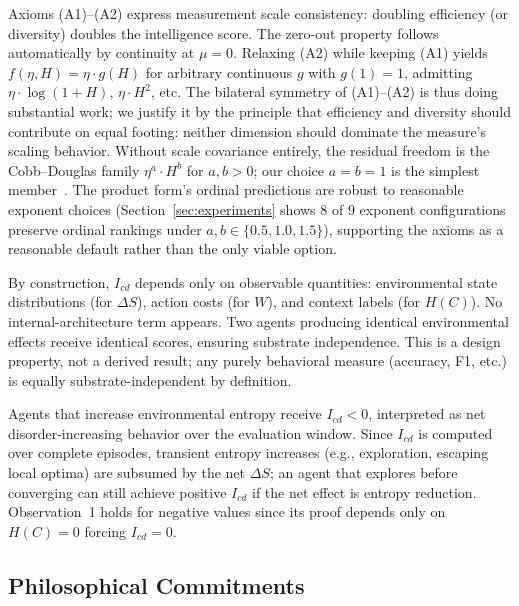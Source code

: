 \documentclass[runningheads,a4paper]{llncs}
\begin{document}
Axioms (A1)--(A2) express measurement scale consistency: doubling efficiency (or diversity) doubles the intelligence score. The zero-out property follows automatically by continuity at $\mu = 0$. Relaxing (A2) while keeping (A1) yields $f(\eta, H) = \eta \cdot g(H)$ for arbitrary continuous $g$ with $g(1) = 1$, admitting $\eta \cdot \log(1+H)$, $\eta \cdot H^2$, etc. The bilateral symmetry of (A1)--(A2) is thus doing substantial work; we justify it by the principle that efficiency and diversity should contribute on equal footing: neither dimension should dominate the measure's scaling behavior. Without scale covariance entirely, the residual freedom is the Cobb--Douglas family $\eta^a \cdot H^b$ for $a, b > 0$; our choice $a = b = 1$ is the simplest member~\cite{krantz1971foundations}. The product form's ordinal predictions are robust to reasonable exponent choices (Section~\ref{sec:experiments} shows 8 of 9 exponent configurations preserve ordinal rankings under $a, b \in \{0.5, 1.0, 1.5\}$), supporting the axioms as a reasonable default rather than the only viable option.

\begin{remark}
By construction, $I_{cd}$ depends only on observable quantities: environmental state distributions (for $\Delta S$), action costs (for $W$), and context labels (for $H(C)$). No internal-architecture term appears. Two agents producing identical environmental effects receive identical scores, ensuring substrate independence. This is a design property, not a derived result; any purely behavioral measure (accuracy, F1, etc.) is equally substrate-independent by definition.
\end{remark}

\begin{remark}[Negative $I_{cd}$]
Agents that increase environmental entropy receive $I_{cd} < 0$, interpreted as net disorder-increasing behavior over the evaluation window. Since $I_{cd}$ is computed over complete episodes, transient entropy increases (e.g., exploration, escaping local optima) are subsumed by the net $\Delta S$; an agent that explores before converging can still achieve positive $I_{cd}$ if the net effect is entropy reduction. Observation~1 holds for negative values since its proof depends only on $H(C) = 0$ forcing $I_{cd} = 0$.
\end{remark}

\subsection{Philosophical Commitments}
\label{sec:philosophy}
\end{document}
